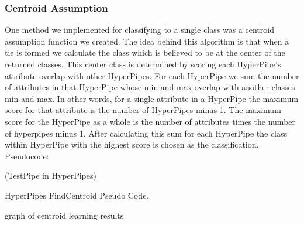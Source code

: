 \subsubsection{Centroid Assumption}
One method we implemented for classifying to a single class was
a centroid assumption function we created. The idea behind this
algorithm is that when a tie is formed we calculate the class 
which is believed to be at the center of the returned classes. 
This center class is determined by scoring each HyperPipe's 
attribute overlap with other HyperPipes. For each HyperPipe we 
sum the number of attributes in that HyperPipe whose min and max 
overlap with another classes min and max. In other words, for a 
single attribute in a HyperPipe the maximum score for that 
attribute is the number of HyperPipes minus 1. The maximum score 
for the HyperPipe as a whole is the number of attributes times 
the number of hyperpipes minus 1. After calculating this sum for 
each HyperPipe the class within HyperPipe with the highest score 
is chosen as the classification. Pseudocode:
\begin{program}
\begin{algorithmic}
\ForAll(TestPipe in HyperPipes)
\EndIf
\EndFor
\EndIf
\EndFor
\EndFor
\EndProcedure
\end{algorithmic}
\caption{HyperPipes FindCentroid Pseudo Code.}\label{PseudocodeCentroid}
\end{program}
graph of centroid learning results

